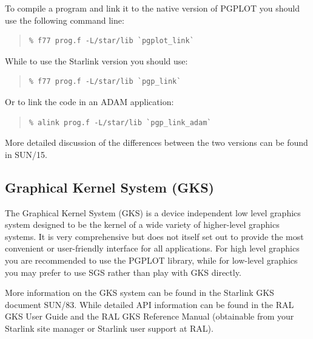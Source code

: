 \documentclass[twoside,11pt]{article}
\newcommand{\htmladdnormallink}[2]{#1}
\newcommand{\htmlref}[2]{#1}
\newcommand{\xref}[3]{#1}
\newcommand{\xlabel}[1]{}
\begin{document}
To compile a program and link it to the native version of PGPLOT you
should use the following command line:

\small
\begin{quote}
\begin{verbatim}              
% f77 prog.f -L/star/lib `pgplot_link` 
\end{verbatim}
\end{quote}
\normalsize

While to use the Starlink version you should use:

\small
\begin{quote}
\begin{verbatim}   
% f77 prog.f -L/star/lib `pgp_link` 
\end{verbatim}
\end{quote}
\normalsize

Or to link the code in an \xref{ADAM}{sun113}{} application:

\small
\begin{quote}
\begin{verbatim}   
% alink prog.f -L/star/lib `pgp_link_adam` 
\end{verbatim}
\end{quote}
\normalsize

More detailed discussion of the differences between the two versions
can be found in \xref{SUN/15}{sun15}{}.

\subsection{\xlabel{sc15_gks}Graphical Kernel System (GKS)\label{sc15_gks}}

The Graphical Kernel System (GKS) is a device independent low level
graphics system designed to be the kernel of a wide variety of
higher-level graphics systems. It is very comprehensive but does not
itself set out to provide the most convenient or user-friendly
interface for all applications. For high level graphics you are
recommended to use the \htmlref{PGPLOT}{sc15_pgplot} library, while
for low-level graphics you may prefer to use \htmlref{SGS}{sc15_sgs}
rather than play with GKS directly.

More information on the GKS system can be found in the Starlink GKS
document \xref{SUN/83}{sun83}{}. While detailed API information can be
found in the \htmladdnormallink{RAL GKS User
Guide}{http://www.itd.clrc.ac.uk/Publications/RAL-GKS/gksguide.html}
and the \htmladdnormallink{RAL GKS Reference
Manual}{http://www.itd.clrc.ac.uk/Publications/RAL-GKS/gks_cat.html}
(obtainable from your Starlink site manager or Starlink user support
at RAL).
\end{document}
